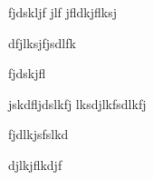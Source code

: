 fjdskljf jlf
jfldkjflksj

dfjlksjfjsdlfk

fjdskjfl

       jskdfljdslkfj lksdjlkfsdlkfj %

fjdlkjsfslkd



djlkjflkdjf
